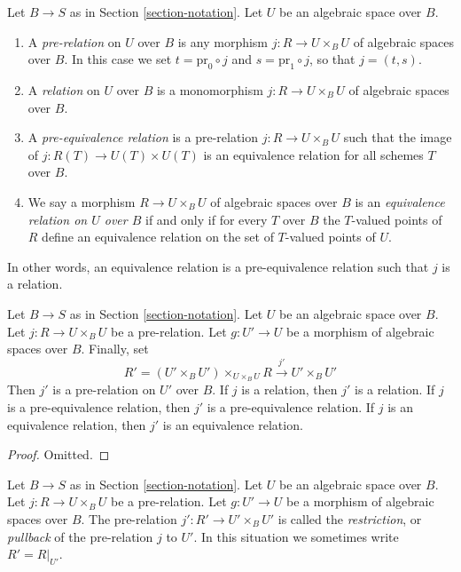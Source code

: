 \begin{definition}
\label{definition-equivalence-relation}
Let $B \to S$ as in Section \ref{section-notation}.
Let $U$ be an algebraic space over $B$.
\begin{enumerate}
\item A {\it pre-relation} on $U$ over $B$ is any morphism
$j : R \to U \times_B U$ of algebraic spaces over $B$.
In this case we set
$t = \text{pr}_0 \circ j$ and $s = \text{pr}_1 \circ j$, so
that $j = (t, s)$.
\item A {\it relation} on $U$ over $B$ is a monomorphism
$j : R \to U \times_B U$ of algebraic spaces over $B$.
\item A {\it pre-equivalence relation} is a pre-relation
$j : R \to U \times_B U$ such that the image of
$j : R(T) \to U(T) \times U(T)$ is an equivalence relation for
all schemes $T$ over $B$.
\item We say a morphism $R \to U \times_B U$ of algebraic spaces over $B$
is an {\it equivalence relation on $U$ over $B$}
if and only if for every $T$ over $B$ the $T$-valued
points of $R$ define an equivalence relation
on the set of $T$-valued points of $U$.
\end{enumerate}
\end{definition}

\noindent
In other words, an equivalence relation is a pre-equivalence relation
such that $j$ is a relation.

\begin{lemma}
\label{lemma-restrict-relation}
Let $B \to S$ as in Section \ref{section-notation}.
Let $U$ be an algebraic space over $B$.
Let $j : R \to U \times_B U$ be a pre-relation.
Let $g : U' \to U$ be a morphism of algebraic spaces over $B$.
Finally, set
$$
R' = (U' \times_B U')\times_{U \times_B U} R
\xrightarrow{j'}
U' \times_B U'
$$
Then $j'$ is a pre-relation on $U'$ over $B$.
If $j$ is a relation, then $j'$ is a relation.
If $j$ is a pre-equivalence relation, then $j'$ is a pre-equivalence relation.
If $j$ is an equivalence relation, then $j'$ is an equivalence relation.
\end{lemma}

\begin{proof}
Omitted.
\end{proof}

\begin{definition}
\label{definition-restrict-relation}
Let $B \to S$ as in Section \ref{section-notation}.
Let $U$ be an algebraic space over $B$.
Let $j : R \to U \times_B U$ be a pre-relation.
Let $g : U' \to U$ be a morphism of algebraic spaces over $B$.
The pre-relation $j' : R' \to U' \times_B U'$ is called
the {\it restriction}, or {\it pullback} of the pre-relation $j$ to $U'$.
In this situation we sometimes write $R' = R|_{U'}$.
\end{definition}

